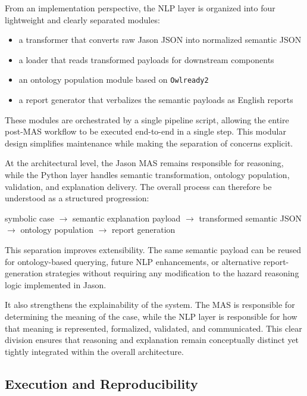 \documentclass[12pt]{article}
\let\oldtexttt\texttt
\renewcommand{\texttt}[1]{{\fontsize{10.5}{12}\selectfont\oldtexttt{#1}}}
\begin{document}
From an implementation perspective, the NLP layer is organized into four lightweight and clearly separated modules:

\begin{itemize}
\item a transformer that converts raw Jason JSON into normalized semantic JSON
\item a loader that reads transformed payloads for downstream components
\item an ontology population module based on \texttt{Owlready2}
\item a report generator that verbalizes the semantic payloads as English reports
\end{itemize}

These modules are orchestrated by a single pipeline script, allowing the entire post-MAS workflow to be executed end-to-end in a single step. This modular design simplifies maintenance while making the separation of concerns explicit.

At the architectural level, the Jason MAS remains responsible for reasoning, while the Python layer handles semantic transformation, ontology population, validation, and explanation delivery. The overall process can therefore be understood as a structured progression:

\begin{center}
symbolic case $\rightarrow$ semantic explanation payload $\rightarrow$ transformed semantic JSON $\rightarrow$ ontology population $\rightarrow$ report generation
\end{center}

This separation improves extensibility. The same semantic payload can be reused for ontology-based querying, future NLP enhancements, or alternative report-generation strategies without requiring any modification to the hazard reasoning logic implemented in Jason.

It also strengthens the explainability of the system. The MAS is responsible for determining the meaning of the case, while the NLP layer is responsible for how that meaning is represented, formalized, validated, and communicated. This clear division ensures that reasoning and explanation remain conceptually distinct yet tightly integrated within the overall architecture.

\subsection{Execution and Reproducibility}
\end{document}
